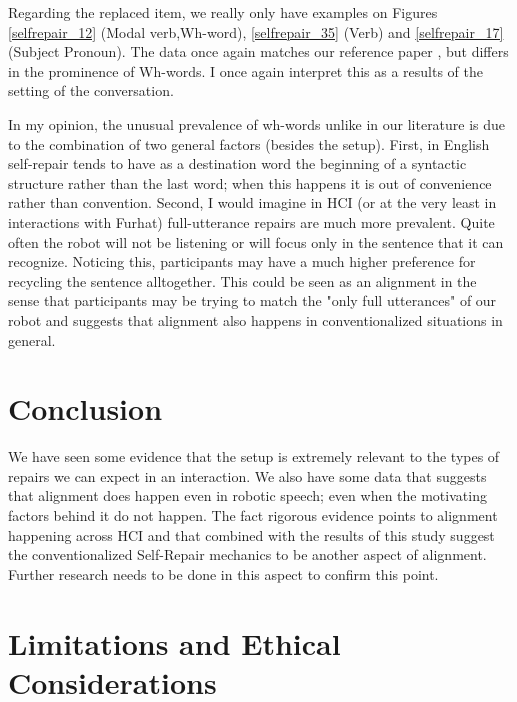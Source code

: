 \documentclass[11pt]{article}
\begin{document}
Regarding the replaced item, we really only have examples on Figures \ref{selfrepair_12} (Modal verb,Wh-word), \ref{selfrepair_35} (Verb) and \ref{selfrepair_17} (Subject Pronoun). The data once again matches our reference paper \cite{fox20102487}, but differs in the prominence of Wh-words. I once again interpret this as a results of the setting of the conversation.

In my opinion, the unusual prevalence of wh-words unlike in our literature \cite{fox20102487} is due to the combination of two general factors (besides the setup). First, in  English self-repair tends to have as a destination word the beginning of a syntactic structure rather than the last word; when this happens it is out of convenience rather than convention. Second, I would imagine in HCI (or at the very least in interactions with Furhat) full-utterance repairs are much more prevalent. Quite often the robot will not be listening or will focus only in the sentence that it can recognize. Noticing this, participants may have a much higher preference for recycling the sentence alltogether. This could be seen as an alignment in the sense that participants may be trying to match the "only full utterances" of our robot and suggests that alignment also happens in conventionalized situations in general.

\section{Conclusion}

We have seen some evidence that the setup is extremely relevant to the types of repairs we can expect in an interaction. We also have some data that suggests that alignment does happen even in robotic speech; even when the motivating factors behind it do not happen. The fact rigorous evidence \cite{fox20102487} points to alignment happening across HCI and that combined with the results of this study suggest the conventionalized Self-Repair mechanics to be another aspect of alignment. Further research needs to be done in this aspect to confirm this point.

\section{Limitations and Ethical Considerations}
\end{document}
